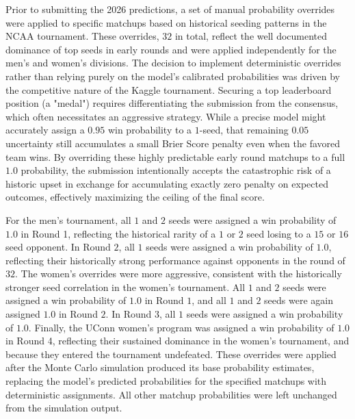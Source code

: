 \documentclass[12pt,leqno]{article}\usepackage[pdftex]{graphicx}\usepackage[dvipsnames]{xcolor}
\theoremstyle{remark}
\begin{document}
Prior to submitting the 2026 predictions, a set of manual probability overrides were applied to specific matchups based on historical seeding patterns in the NCAA tournament. These overrides, $32$ in total, reflect the well documented dominance of top seeds in early rounds and were applied independently for the men's and women's divisions. The decision to implement deterministic overrides rather than relying purely on the model's calibrated probabilities was driven by the competitive nature of the Kaggle tournament. Securing a top leaderboard position (a "medal") requires differentiating the submission from the consensus, which often necessitates an aggressive strategy. While a precise model might accurately assign a $0.95$ win probability to a $1$-seed, that remaining $0.05$ uncertainty still accumulates a small Brier Score penalty even when the favored team wins. By overriding these highly predictable early round matchups to a full $1.0$ probability, the submission intentionally accepts the catastrophic risk of a historic upset in exchange for accumulating exactly zero penalty on expected outcomes, effectively maximizing the ceiling of the final score.

For the men's tournament, all $1$ and $2$ seeds were assigned a win probability of $1.0$ in Round 1, reflecting the historical rarity of a $1$ or $2$ seed losing to a $15$ or $16$ seed opponent. In Round $2$, all $1$ seeds were assigned a win probability of $1.0$, reflecting their historically strong performance against opponents in the round of $32$. The women's overrides were more aggressive, consistent with the historically stronger seed correlation in the women's tournament. All $1$ and $2$ seeds were assigned a win probability of $1.0$ in Round $1$, and all $1$ and $2$ seeds were again assigned $1.0$ in Round $2$. In Round $3$, all $1$ seeds were assigned a win probability of $1.0$. Finally, the UConn women's program was assigned a win probability of $1.0$ in Round 4, reflecting their sustained dominance in the women's tournament, and because they entered the tournament undefeated. These overrides were applied after the Monte Carlo simulation produced its base probability estimates, replacing the model's predicted probabilities for the specified matchups with deterministic assignments. All other matchup probabilities were left unchanged from the simulation output.
\end{document}
